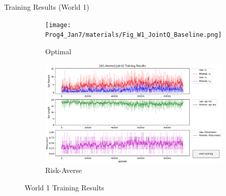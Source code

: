 \documentclass[aspectratio=1610, xcolor=dvipsnames]{packages/beamer}
\begin{document}
\begin{frame}{Training Results (World 1)}
     \begin{figure}
     \centering
          \begin{subfigure}[b]{\Wfig\textwidth}  \centering
              \texttt{[image: Prog4\_Jan7/materials/Fig\_W1\_JointQ\_Baseline.png]}
              \caption{Optimal} \label{fig:W1baseline}
          \end{subfigure}
          \hfill
         \begin{subfigure}[b]{\Wfig\textwidth} \centering
             \includegraphics[width=\textwidth]{../results/IDQN_W1/Fig_W1_JointQ_Averse}
             \caption{Risk-Averse} \label{fig:W1averse}
         \end{subfigure}
    \caption{World 1 Training Results}
    \label{fig:W1}
    \end{figure}
\end{frame}
\end{document}
